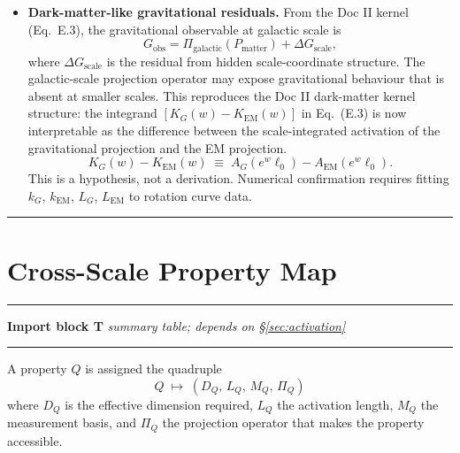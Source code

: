 \documentclass[11pt, a4paper, oneside]{article}
\theoremstyle{definition}
\theoremstyle{plain}
\theoremstyle{remark}
\begin{document}
\begin{itemize}
  \item \textbf{Dark-matter-like gravitational residuals.}
    From the Doc II kernel (Eq.~E.3), the gravitational observable at
    galactic scale is
    \begin{equation}
      G_\mathrm{obs} = \Pi_\mathrm{galactic}(P_\mathrm{matter}) + \Delta G_\mathrm{scale},
      \label{eq:dark_residual}
    \end{equation}
    where $\Delta G_\mathrm{scale}$ is the residual from hidden
    scale-coordinate structure.
    The galactic-scale projection operator may expose gravitational
    behaviour that is absent at smaller scales.
    This reproduces the Doc II dark-matter kernel structure: the
    integrand $[K_G(w) - K_\mathrm{EM}(w)]$ in Eq.~(E.3) is now
    interpretable as the difference between the scale-integrated
    activation of the gravitational projection and the
    EM projection.
    \begin{equation}
      K_G(w) - K_\mathrm{EM}(w)
      \;\equiv\;
      A_G(e^w \ell_0) - A_\mathrm{EM}(e^w \ell_0).
      \label{eq:kernel_activation}
    \end{equation}
    This is a hypothesis, not a derivation.
    Numerical confirmation requires fitting $k_G$, $k_\mathrm{EM}$,
    $L_G$, $L_\mathrm{EM}$ to rotation curve data.
\end{itemize}

\noindent\rule{\linewidth}{0.4pt}

\section{Cross-Scale Property Map}
\label{sec:property_map}

\noindent\rule{\linewidth}{0.8pt}
\textbf{Import block T} \hfill
  \textit{summary table; depends on \S\ref{sec:activation}}
\noindent\rule{\linewidth}{0.4pt}

A property $Q$ is assigned the quadruple
\begin{equation}
  Q \;\mapsto\; (D_Q,\, L_Q,\, M_Q,\, \Pi_Q)
  \label{eq:prop_map}
\end{equation}
where $D_Q$ is the effective dimension required, $L_Q$ the activation
length, $M_Q$ the measurement basis, and $\Pi_Q$ the projection operator
that makes the property accessible.

\bigskip
\end{document}
